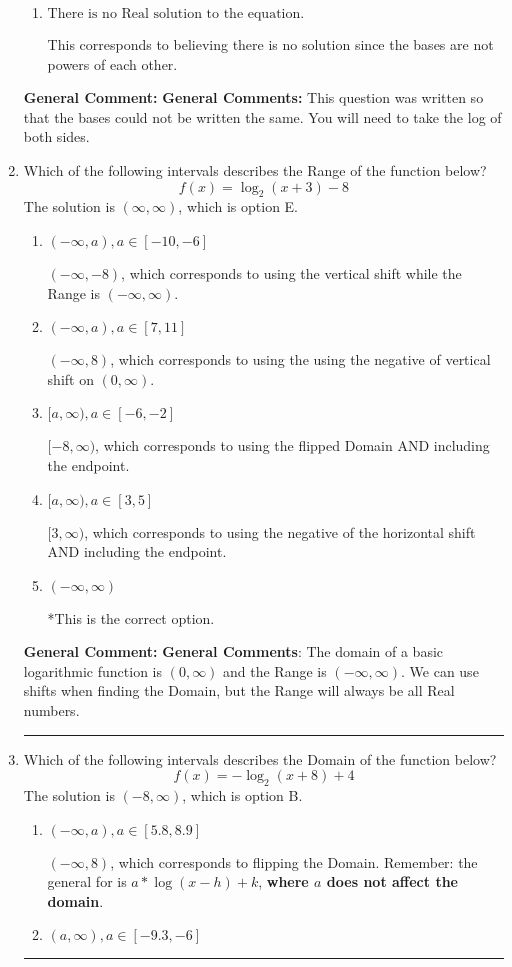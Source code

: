 \documentclass{extbook}[14pt]
\newcommand{\litem}[1]{\item #1

\rule{\textwidth}{0.4pt}}
\begin{document}
\begin{enumerate}
{\begin{enumerate}[label=\Alph*.]
$x = 1.500$, which corresponds to solving the numerators as equal while ignoring the bases are different.
\item \( \text{There is no Real solution to the equation.} \)

This corresponds to believing there is no solution since the bases are not powers of each other.
\end{enumerate}

\textbf{General Comment:} \textbf{General Comments:} This question was written so that the bases could not be written the same. You will need to take the log of both sides.
}
\litem{
Which of the following intervals describes the Range of the function below?
\[ f(x) = \log_2{(x+3)}-8 \]The solution is \( (\infty, \infty) \), which is option E.\begin{enumerate}[label=\Alph*.]
\item \( (-\infty, a), a \in [-10, -6] \)

$(-\infty, -8)$, which corresponds to using the vertical shift while the Range is $(-\infty, \infty)$.
\item \( (-\infty, a), a \in [7, 11] \)

$(-\infty, 8)$, which corresponds to using the using the negative of vertical shift on $(0, \infty)$.
\item \( [a, \infty), a \in [-6, -2] \)

$[-8, \infty)$, which corresponds to using the flipped Domain AND including the endpoint.
\item \( [a, \infty), a \in [3, 5] \)

$[3, \infty)$, which corresponds to using the negative of the horizontal shift AND including the endpoint.
\item \( (-\infty, \infty) \)

*This is the correct option.
\end{enumerate}

\textbf{General Comment:} \textbf{General Comments}: The domain of a basic logarithmic function is $(0, \infty)$ and the Range is $(-\infty, \infty)$. We can use shifts when finding the Domain, but the Range will always be all Real numbers.
}
\litem{
Which of the following intervals describes the Domain of the function below?
\[ f(x) = -\log_2{(x+8)}+4 \]The solution is \( (-8, \infty) \), which is option B.\begin{enumerate}[label=\Alph*.]
\item \( (-\infty, a), a \in [5.8, 8.9] \)

$(-\infty, 8)$, which corresponds to flipping the Domain. Remember: the general for is $a*\log(x-h)+k$, \textbf{where $a$ does not affect the domain}.
\item \( (a, \infty), a \in [-9.3, -6] \)


\end{enumerate}}
\end{enumerate}
\end{document}
